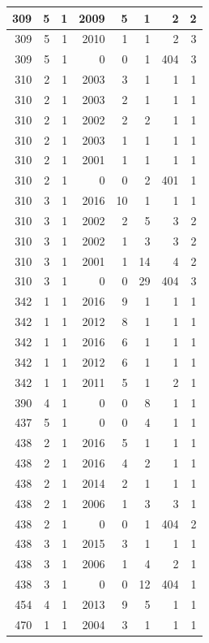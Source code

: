 \documentclass[11pt,]{book}
\begin{document}
\begin{table}
\begin{tabular}[t]{r|r|r|r|r|r|r|r}
\hline
309 & 5 & 1 & 2009 & 5 & 1 & 2 & 2\\
\hline
309 & 5 & 1 & 2010 & 1 & 1 & 2 & 3\\
\hline
309 & 5 & 1 & 0 & 0 & 1 & 404 & 3\\
\hline
310 & 2 & 1 & 2003 & 3 & 1 & 1 & 1\\
\hline
310 & 2 & 1 & 2003 & 2 & 1 & 1 & 1\\
\hline
310 & 2 & 1 & 2002 & 2 & 2 & 1 & 1\\
\hline
310 & 2 & 1 & 2003 & 1 & 1 & 1 & 1\\
\hline
310 & 2 & 1 & 2001 & 1 & 1 & 1 & 1\\
\hline
310 & 2 & 1 & 0 & 0 & 2 & 401 & 1\\
\hline
310 & 3 & 1 & 2016 & 10 & 1 & 1 & 1\\
\hline
310 & 3 & 1 & 2002 & 2 & 5 & 3 & 2\\
\hline
310 & 3 & 1 & 2002 & 1 & 3 & 3 & 2\\
\hline
310 & 3 & 1 & 2001 & 1 & 14 & 4 & 2\\
\hline
310 & 3 & 1 & 0 & 0 & 29 & 404 & 3\\
\hline
342 & 1 & 1 & 2016 & 9 & 1 & 1 & 1\\
\hline
342 & 1 & 1 & 2012 & 8 & 1 & 1 & 1\\
\hline
342 & 1 & 1 & 2016 & 6 & 1 & 1 & 1\\
\hline
342 & 1 & 1 & 2012 & 6 & 1 & 1 & 1\\
\hline
342 & 1 & 1 & 2011 & 5 & 1 & 2 & 1\\
\hline
390 & 4 & 1 & 0 & 0 & 8 & 1 & 1\\
\hline
437 & 5 & 1 & 0 & 0 & 4 & 1 & 1\\
\hline
438 & 2 & 1 & 2016 & 5 & 1 & 1 & 1\\
\hline
438 & 2 & 1 & 2016 & 4 & 2 & 1 & 1\\
\hline
438 & 2 & 1 & 2014 & 2 & 1 & 1 & 1\\
\hline
438 & 2 & 1 & 2006 & 1 & 3 & 3 & 1\\
\hline
438 & 2 & 1 & 0 & 0 & 1 & 404 & 2\\
\hline
438 & 3 & 1 & 2015 & 3 & 1 & 1 & 1\\
\hline
438 & 3 & 1 & 2006 & 1 & 4 & 2 & 1\\
\hline
438 & 3 & 1 & 0 & 0 & 12 & 404 & 1\\
\hline
454 & 4 & 1 & 2013 & 9 & 5 & 1 & 1\\
\hline
470 & 1 & 1 & 2004 & 3 & 1 & 1 & 1\\
\hline

\end{tabular}
\end{table}
\end{document}
